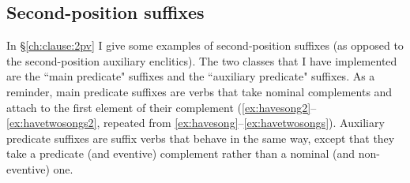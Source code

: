 \begin{comment}
That is, the attribute-value matrix (AVM) for the full predicate complex \textit{=ʔaqƛ=s} in (\ref{ex:2padvpred}) should look something like this:

\ex \label{ex:2pmodavm}
\begin{avm}
\[\asort{clausal-inflection}
   head.pred & + \\
   comp & \< \[ \textsc{head} & +mod \\
 	               mod & \< \[ head.pred & + \\
 	                                    subj & 1sg \\
 	                                    e.tense & future \] \> \] \> \]
\end{avm}
\xe




\ex \label{ex:2pmodrule}
\begin{avm}
\[\asort{clausal-inflection-mod}
 \textsc{head.pred} & + \\
   subj & \avmbox{1} \\
   \textsc{comp} & \< \[ \textsc{head} & +mod \\
 	               \textsc{mod} & \< \[ \textsc{head.pred} & + \\
 	                                    \textsc{subj} & \avmbox{1} \\
 	                                    \textsc{comp} & \avmbox{2} \] \> \] \> $\oplus$ \avmbox{2} \\
   \textsc{dtr} & \textit{clausal-inflection} \]
\end{avm}
\xe
\end{comment}

\subsection{Second-position suffixes} \label{ch:clause:analysis:2pv}

In \S\ref{ch:clause:2pv} I give some examples of second-position suffixes (as opposed to the second-position auxiliary enclitics). The two classes that I have implemented are the ``main predicate" suffixes and the ``auxiliary predicate" suffixes. As a reminder, main predicate suffixes are verbs that take nominal complements and attach to the first element of their complement (\ref{ex:havesong2}--\ref{ex:havetwosongs2}, repeated from \ref{ex:havesong}--\ref{ex:havetwosongs}). Auxiliary predicate suffixes are suffix verbs that behave in the same way, except that they take a predicate (and eventive) complement rather than a nominal (and non-eventive) one.

